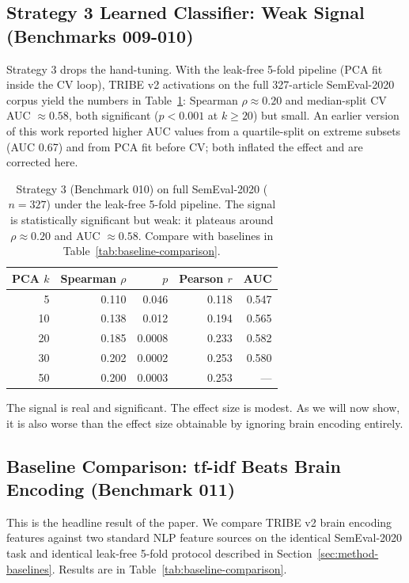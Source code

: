 \documentclass[11pt]{article}
\begin{document}
\subsection{Strategy 3 Learned Classifier: Weak Signal (Benchmarks 009-010)}

Strategy 3 drops the hand-tuning. With the leak-free 5-fold pipeline (PCA fit inside the CV loop), TRIBE v2 activations on the full 327-article SemEval-2020 corpus yield the numbers in Table~\ref{tab:strategy3-semeval}: Spearman $\rho \approx 0.20$ and median-split CV AUC $\approx 0.58$, both significant ($p < 0.001$ at $k \geq 20$) but small. An earlier version of this work reported higher AUC values from a quartile-split on extreme subsets (AUC 0.67) and from PCA fit before CV; both inflated the effect and are corrected here.

\begin{table}[t]
    \centering
    \small
    \begin{tabular}{@{}rrrrr@{}}
        \toprule
        PCA $k$ & Spearman $\rho$ & $p$ & Pearson $r$ & AUC \\
        \midrule
        5   & 0.110 & 0.046   & 0.118 & 0.547 \\
        10  & 0.138 & 0.012   & 0.194 & 0.565 \\
        20  & 0.185 & 0.0008  & 0.233 & 0.582 \\
        30  & 0.202 & 0.0002  & 0.253 & 0.580 \\
        50  & 0.200 & 0.0003  & 0.253 & --- \\
        \bottomrule
    \end{tabular}
    \caption{Strategy 3 (Benchmark 010) on full SemEval-2020 ($n=327$) under the leak-free 5-fold pipeline. The signal is statistically significant but weak: it plateaus around $\rho \approx 0.20$ and AUC $\approx 0.58$. Compare with baselines in Table~\ref{tab:baseline-comparison}.}
    \label{tab:strategy3-semeval}
\end{table}

The signal is real and significant. The effect size is modest. As we will now show, it is also worse than the effect size obtainable by ignoring brain encoding entirely.

\subsection{Baseline Comparison: tf-idf Beats Brain Encoding (Benchmark 011)}
\label{sec:results-baselines}

This is the headline result of the paper. We compare TRIBE v2 brain encoding features against two standard NLP feature sources on the identical SemEval-2020 task and identical leak-free 5-fold protocol described in Section~\ref{sec:method-baselines}. Results are in Table~\ref{tab:baseline-comparison}.
\end{document}
